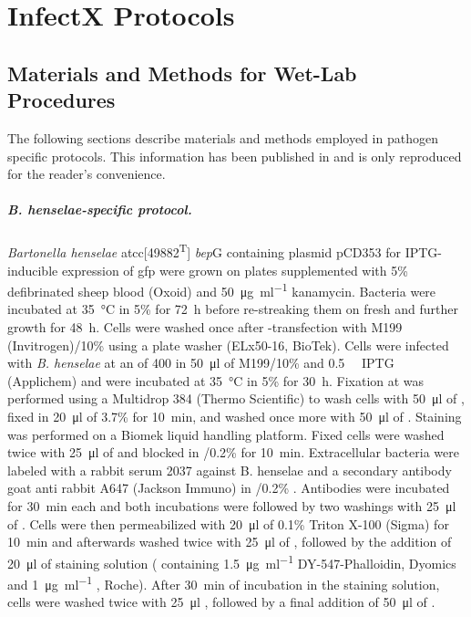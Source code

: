 \chapter{InfectX Protocols}

\section{Materials and Methods for Wet-Lab Procedures}
\label{sec:pathogen-protocols}
The following sections describe materials and methods employed in pathogen specific protocols. This information has been published in \citet{Ramo2014} and is only reproduced for the reader's convenience.

\paragraph{\textit{B. henselae}-specific protocol.}
\textit{Bartonella henselae} \acrshort{atcc}[49882\textsuperscript{T}] \textDelta\textit{bep}G containing plasmid pCD353 \citep{Dehio1998} for IPTG-inducible expression of \acrshort{gfp} were grown on  plates supplemented with 5\% defibrinated sheep blood (Oxoid) and \SI{50}{\micro\gram\per\milli\litre} kanamycin. Bacteria were incubated at \SI{35}{\celsius} in 5\%  for \SI{72}{\hour} before re-streaking them on fresh  and further growth for \SI{48}{\hour}. Cells were washed once after -transfection with M199 (Invitrogen)\slash 10\%  using a plate washer (ELx50-16, BioTek). Cells were infected with \textit{B. henselae} at an  of 400 in \SI{50}{\micro\litre} of M199\slash 10\%  and \SI{0.5}{\milli\Molar} IPTG (Applichem) and were incubated at \SI{35}{\celsius} in 5\%  for \SI{30}{\hour}. Fixation at  was performed using a Multidrop 384 (Thermo Scientific) to wash cells with \SI{50}{\micro\litre} of , fixed in \SI{20}{\micro\litre} of 3.7\%  for \SI{10}{\minute}, and washed once more with \SI{50}{\micro\litre} of . Staining was performed on a Biomek liquid handling platform. Fixed cells were washed twice with \SI{25}{\micro\litre} of  and blocked in \slash 0.2\%  for \SI{10}{\minute}. Extracellular bacteria were labeled with a rabbit serum 2037 against B. henselae \citep{Dehio1997} and a secondary antibody goat anti rabbit A647 (Jackson Immuno) in \slash 0.2\% . Antibodies were incubated for \SI{30}{\minute} each and both incubations were followed by two washings with \SI{25}{\micro\litre} of . Cells were then permeabilized with \SI{20}{\micro\litre} of 0.1\% Triton X-100 (Sigma) for \SI{10}{\minute} and afterwards washed twice with \SI{25}{\micro\litre} of , followed by the addition of \SI{20}{\micro\litre} of staining solution ( containing \SI{1.5}{\micro\gram\per\milli\litre} DY-547-Phalloidin, Dyomics and \SI{1}{\micro\gram\per\milli\litre} , Roche). After \SI{30}{\minute} of incubation in the staining solution, cells were washed twice with \SI{25}{\micro\litre} , followed by a final addition of \SI{50}{\micro\litre} of .


